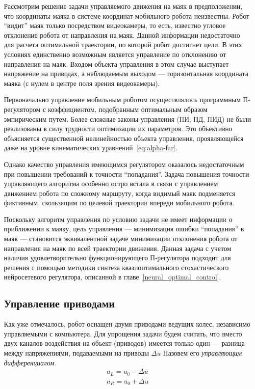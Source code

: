 Рассмотрим решение задачи управляемого движения на маяк в
предположении, что координаты маяка в системе координат мобильного
робота неизвестны.  Робот ``видит'' маяк только посредством
видеокамеры, то есть, известно угловое отклонение робота от
направления на маяк.  Данной информации недостаточно для расчета
оптимальной траектории, по которой робот достигнет цели.  В этих
условиях единственно возможным является управление по отклонению от
направления на маяк.  Входом объекта управления в этом случае
выступает напряжение на приводах, а наблюдаемым выходом ---
горизонтальная координата маяка (с нулем в центре поля зрения
видеокамеры).

Первоначально управление мобильным роботом осуществлялось программным
П-регулятором с коэффициентом, подобранным оптимальным образом
эмпирическим путем.  Более сложные законы управления (ПИ, ПД, ПИД) не
были реализованы в силу трудности оптимизации их параметров.  Это
объективно объясняется существенной нелинейностью объекта управления,
проявляющейся даже на уровне кинематических
уравнений~\eqref{eq:alpha-far}.

Однако качество управления имеющимся регулятором оказалось
недостаточным при повышении требований к точности ``попадания''.
Задача повышения точности управляющего алгоритма особенно остро встала
в связи с управлением движением робота по сложному маршруту, когда
видимый маяк подменяется фиктивным, скользящим по целевой траектории
впереди мобильного робота.

Поскольку алгоритм управления по условию задачи не имеет информации о
приближении к маяку, цель управления --- минимизация ошибки
``попадания'' в маяк --- становится эквивалентной задаче минимизации
отклонения робота от направления на маяк по всей траектории движения.
Данная задача с учетом наличия удовлетворительно функционирующего
П-регулятора подходит для решения с помощью методики синтеза
квазиоптимального стохастического нейросетевого регулятора, описанной
в главе~\ref{neural_optimal_control}.

\subsection{Управление приводами}

Как уже отмечалось, робот оснащен двумя приводами ведущих колес,
независимо управляемыми с компьютера.  Для упрощения задачи будем
считать, что вместо двух каналов воздействия на объект (приводов)
имеется только один --- разница между напряжениями, подаваемыми на
приводы $\Delta u$  Назовем его {\it управляющим дифференциалом}.
$$\begin{array}{l}
u_L=u_0-\Delta u\\
u_R=u_0+\Delta u
\end{array}$$

